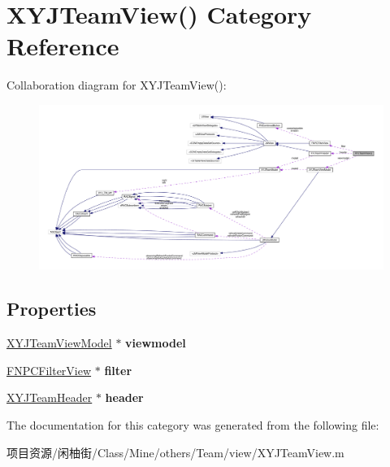 \hypertarget{category_x_y_j_team_view_07_08}{}\section{X\+Y\+J\+Team\+View() Category Reference}
\label{category_x_y_j_team_view_07_08}


Collaboration diagram for X\+Y\+J\+Team\+View()\+:\nopagebreak
\begin{figure}[H]
\begin{center}
\leavevmode
\includegraphics[width=350pt]{category_x_y_j_team_view_07_08__coll__graph}
\end{center}
\end{figure}
\subsection*{Properties}
\begin{DoxyCompactItemize}
\item 
\mbox{\label{category_x_y_j_team_view_07_08_aa074ca31a78fc4e5072c9c6b5ab4ce86}} 
\mbox{\hyperlink{interface_x_y_j_team_view_model}{X\+Y\+J\+Team\+View\+Model}} $\ast$ {\bfseries viewmodel}
\item 
\mbox{\label{category_x_y_j_team_view_07_08_a287a7257a257450008359934bd50fcfc}} 
\mbox{\hyperlink{interface_f_n_p_c_filter_view}{F\+N\+P\+C\+Filter\+View}} $\ast$ {\bfseries filter}
\item 
\mbox{\label{category_x_y_j_team_view_07_08_a0208888315c3a8a0f6504256f21d2929}} 
\mbox{\hyperlink{interface_x_y_j_team_header}{X\+Y\+J\+Team\+Header}} $\ast$ {\bfseries header}
\end{DoxyCompactItemize}


The documentation for this category was generated from the following file\+:\begin{DoxyCompactItemize}
\item 
项目资源/闲柚街/\+Class/\+Mine/others/\+Team/view/X\+Y\+J\+Team\+View.\+m\end{DoxyCompactItemize}
